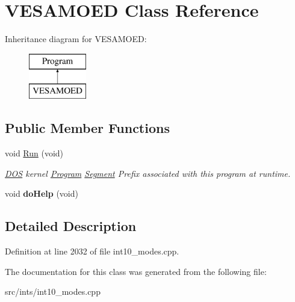 \hypertarget{classVESAMOED}{\section{V\-E\-S\-A\-M\-O\-E\-D Class Reference}
\label{classVESAMOED}
}
Inheritance diagram for V\-E\-S\-A\-M\-O\-E\-D\-:\begin{figure}[H]
\begin{center}
\leavevmode
\includegraphics[height=2.000000cm]{classVESAMOED}
\end{center}
\end{figure}
\subsection*{Public Member Functions}
\begin{DoxyCompactItemize}
\item 
\hypertarget{classVESAMOED_a28a85c525cde20cbffbfbed307b1747e}{void \hyperlink{classVESAMOED_a28a85c525cde20cbffbfbed307b1747e}{Run} (void)}\label{classVESAMOED_a28a85c525cde20cbffbfbed307b1747e}

\begin{DoxyCompactList}\small\item\em \hyperlink{classDOS}{D\-O\-S} kernel \hyperlink{classProgram}{Program} \hyperlink{structSegment}{Segment} Prefix associated with this program at runtime. \end{DoxyCompactList}\item 
\hypertarget{classVESAMOED_a2c8bf90a08d8a67761958333dcbf298b}{void {\bfseries do\-Help} (void)}\label{classVESAMOED_a2c8bf90a08d8a67761958333dcbf298b}

\end{DoxyCompactItemize}


\subsection{Detailed Description}


Definition at line 2032 of file int10\-\_\-modes.\-cpp.



The documentation for this class was generated from the following file\-:\begin{DoxyCompactItemize}
\item 
src/ints/int10\-\_\-modes.\-cpp\end{DoxyCompactItemize}
